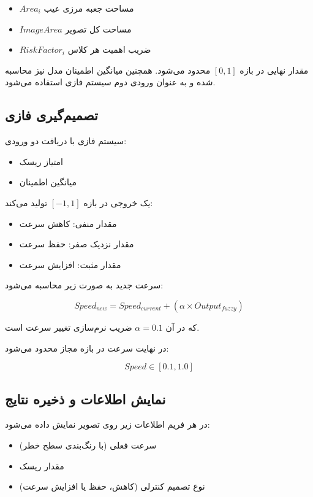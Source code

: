 \documentclass[a4paper, 10pt, twocolumn]{article}
\begin{document}
	\begin{itemize}
		\item $Area_i$ مساحت جعبه مرزی عیب
		\item $ImageArea$ مساحت کل تصویر
		\item $RiskFactor_i$ ضریب اهمیت هر کلاس
	\end{itemize}
	
	مقدار نهایی در بازه $[0,1]$ محدود می‌شود. همچنین میانگین اطمینان مدل نیز محاسبه شده و به عنوان ورودی دوم سیستم فازی استفاده می‌شود.
	
	
	\subsection{تصمیم‌گیری فازی}
	
	سیستم فازی با دریافت دو ورودی:
	
	\begin{itemize}
		\item امتیاز ریسک
		\item میانگین اطمینان
	\end{itemize}
	
	یک خروجی در بازه $[-1,1]$ تولید می‌کند:
	
	\begin{itemize}
		\item مقدار منفی: کاهش سرعت
		\item مقدار نزدیک صفر: حفظ سرعت
		\item مقدار مثبت: افزایش سرعت
	\end{itemize}
	
	سرعت جدید به صورت زیر محاسبه می‌شود:
	
	\[
	Speed_{new} = Speed_{current} + (\alpha \times Output_{fuzzy})
	\]
	
	که در آن $\alpha = 0.1$ ضریب نرم‌سازی تغییر سرعت است.
	
	در نهایت سرعت در بازه مجاز محدود می‌شود:
	
	\[
	Speed \in [0.1, 1.0]
	\]
	
	
	\subsection{نمایش اطلاعات و ذخیره نتایج}
	
	در هر فریم اطلاعات زیر روی تصویر نمایش داده می‌شود:
	
	\begin{itemize}
		\item سرعت فعلی (با رنگ‌بندی سطح خطر)
		\item مقدار ریسک
		\item نوع تصمیم کنترلی (کاهش، حفظ یا افزایش سرعت)
	\end{itemize}
	
\end{document}
